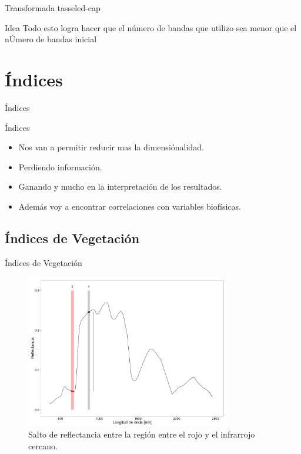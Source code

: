 \documentclass[handout]{beamer}
\begin{document}
\begin{frame}{Transformada tasseled-cap}
  \begin{block}{Idea}
    Todo esto logra hacer que el número de bandas que utilizo sea menor que el nÚmero de bandas inicial
  \end{block}
\end{frame}

\section{\'Indices}

\begin{frame}{\'Indices}
  \begin{block}{\'Indices}
    \begin{itemize}[<+>]
      \item Nos van a permitir reducir mas la dimensiónalidad.
      \item Perdiendo información.
      \item Ganando y mucho en la interpretación de los resultados.
      \item Además voy a encontrar correlaciones con variables biofísicas.
    \end{itemize}
  \end{block}
\end{frame}

\subsection{\'Indices de Vegetación}

\begin{frame}{\'Indices de Vegetación}
    \begin{figure}
    \centering
    \includegraphics[width=0.8\textwidth]{imagenes/salto_nr.png}
    \caption{Salto de reflectancia entre la región entre el rojo y el infrarrojo cercano.}
    \end{figure}
\end{frame}
\end{document}
